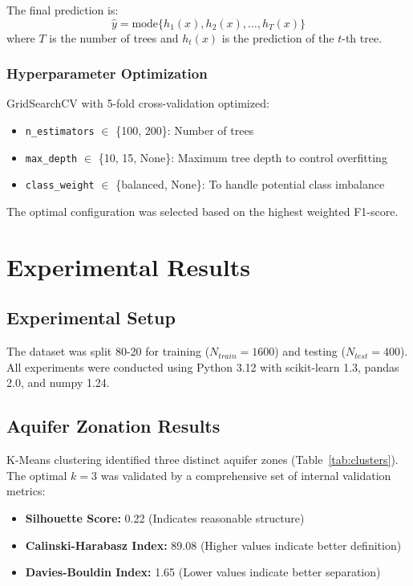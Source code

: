 \documentclass[conference]{IEEEtran}
\begin{document}
The final prediction is:
\begin{equation}
\hat{y} = \text{mode}\{h_1(x), h_2(x), \ldots, h_T(x)\}
\end{equation}
where $T$ is the number of trees and $h_t(x)$ is the prediction of the $t$-th tree.

\subsubsection{Hyperparameter Optimization}
GridSearchCV with 5-fold cross-validation optimized:
\begin{itemize}
\item \texttt{n\_estimators} $\in$ \{100, 200\}: Number of trees
\item \texttt{max\_depth} $\in$ \{10, 15, None\}: Maximum tree depth to control overfitting
\item \texttt{class\_weight} $\in$ \{balanced, None\}: To handle potential class imbalance
\end{itemize}

The optimal configuration was selected based on the highest weighted F1-score.

\section{Experimental Results}

\subsection{Experimental Setup}
The dataset was split 80-20 for training ($N_{train}=1600$) and testing ($N_{test}=400$). All experiments were conducted using Python 3.12 with scikit-learn 1.3, pandas 2.0, and numpy 1.24.

\subsection{Aquifer Zonation Results}
K-Means clustering identified three distinct aquifer zones (Table~\ref{tab:clusters}). The optimal $k=3$ was validated by a comprehensive set of internal validation metrics:
\begin{itemize}
    \item \textbf{Silhouette Score:} 0.22 (Indicates reasonable structure)
    \item \textbf{Calinski-Harabasz Index:} 89.08 (Higher values indicate better definition)
    \item \textbf{Davies-Bouldin Index:} 1.65 (Lower values indicate better separation)
\end{itemize}
\end{document}
